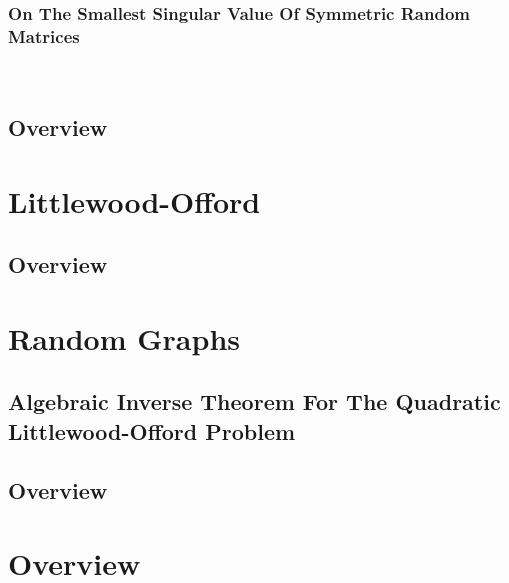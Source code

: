 \documentclass[12pt]{article}
\begin{document}
 

\subsubsection{On The Smallest Singular Value Of Symmetric Random Matrices}

\\\newline

\subsection{Overview}

\newpage
\section{Littlewood-Offord}


\subsection{Overview}

\section{Random Graphs}




\subsection{Algebraic Inverse Theorem For The Quadratic Littlewood-Offord Problem}


\subsection{Overview}

\section{Overview}

\newpage
\printbibliography
\end{document}
